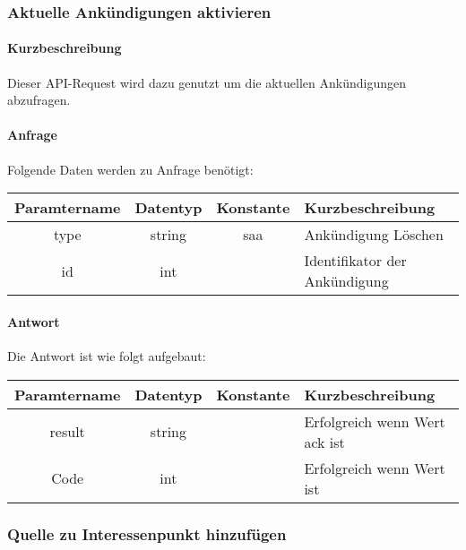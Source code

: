 \subsubsection{Aktuelle Ankündigungen aktivieren}
\paragraph{Kurzbeschreibung}Dieser API-Request wird dazu genutzt um die aktuellen Ankündigungen abzufragen.
\paragraph{Anfrage}Folgende Daten werden zu Anfrage benötigt:
\begin{table}[H]
	\begin{tabular}{|c|c|c|p{6.5cm}|}
		\hline
		\textbf{Paramtername} & \textbf{Datentyp} & \textbf{Konstante} & \textbf{Kurzbeschreibung}                                                                                               \\ \hline
		type                & string            & saa                & Ankündigung Löschen \\ \hline
		id                  & int               &                    & Identifikator der Ankündigung \\ \hline
	\end{tabular}
\end{table}
\paragraph{Antwort}Die Antwort ist wie folgt aufgebaut:
\begin{table}[H]
	\begin{tabular}{|c|c|c|p{6.5cm}|}
		\hline
		\textbf{Paramtername} & \textbf{Datentyp} & \textbf{Konstante} & \textbf{Kurzbeschreibung}                                                                                               \\ \hline
		result              & string           &                 & Erfolgreich wenn Wert {\glqq ack\grqq} ist \\ \hline
		Code                & int              &                 & Erfolgreich wenn Wert {\glqq 0\grqq} ist \\ \hline
	\end{tabular}
\end{table}
\subsubsection{Quelle zu Interessenpunkt hinzufügen}
